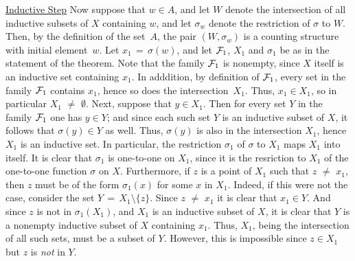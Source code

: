 {        \underline{Inductive Step} Now suppose that $w{\in}A$, and let $W$ denote the intersection of all inductive subsets of $X$ containing $w$,
    and let ${\sigma}_{w}$ denote the restriction of ${\sigma}$ to $W$. Then, by the definition of the set~$A$,
    the pair $(W,{\sigma}_{w})$ is a counting structure with initial element~$w$.
    Let $x_{1} \,=\, {\sigma}(w)$, and let ${\cal F}_{1}$, $X_{1}$ and ${\sigma}_{1}$ be as in the statement of the theorem.
    Note that the family ${\cal F}_{1}$ is nonempty, since $X$ itself is an inductive set containing $x_{1}$.
    In adddition, by definition of ${\cal F}_{1}$, every set in the family ${\cal F}_{1}$ contains $x_{1}$, hence so does the intersection~$X_{1}$.
    Thus, $x_{1}{\in}X_{1}$, so in particular $X_{1} \,\,{\neq}\,\, {\emptyset}$.
    Next, suppose that $y{\in}X_{1}$. Then for every set $Y$ in the family ${\cal F}_{1}$ one has $y{\in}Y$;
    and since each such set $Y$ is an inductive subset of $X$, it follows that ${\sigma}(y){\in}Y$ as well.
    Thus, ${\sigma}(y)$ is also in the intersection $X_{1}$, hence $X_{1}$ is an inductive set.
    In particular, the restriction ${\sigma}_{1}$ of ${\sigma}$ to $X_{1}$ maps $X_{1}$ into itself.
    It is clear that ${\sigma}_{1}$ is one-to-one on $X_{1}$, since it is the resriction to $X_{1}$ of the one-to-one function ${\sigma}$ on $X$.
    Furthermore, if $z$ is a point of $X_{1}$ such that $z \,\,{\neq}\,\, x_{1}$, then $z$ must be of the form ${\sigma}_{1}(x)$ for some $x$ in $X_{1}$.
    Indeed, if this were not the case, consider the set $Y \,=\, X_{1}{\setminus}\{z\}$.
    Since $z \,\,{\neq}\,\, x_{1}$ it is clear that $x_{1}{\in}Y$.
    And since $z$ is not in ${\sigma}_{1}(X_{1})$, and $X_{1}$ is an inductive subset of $X$,
    it is clear that $Y$ is a nonempty inductive subset of $X$ containing $x_{1}$.
    Thus, $X_{1}$, being the intersection of all such sets, must be a subset of $Y$.
    However, this is impossible since $z{\in}X_{1}$ but $z$ is {\em not} in $Y$.

}
